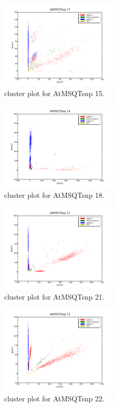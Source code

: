 \begin{figure}[H]
\includegraphics[width=0.5\textwidth]{figures/cluster_plot_AtMSQTsnp_15.png}
\caption{cluster plot for AtMSQTsnp 15.} \label{flAtMSQTsnp15}
\end{figure}

\begin{figure}[H]
\includegraphics[width=0.5\textwidth]{figures/cluster_plot_AtMSQTsnp_18.png}
\caption{cluster plot for AtMSQTsnp 18.} \label{flAtMSQTsnp18}
\end{figure}

\begin{figure}[H]
\includegraphics[width=0.5\textwidth]{figures/cluster_plot_AtMSQTsnp_21.png}
\caption{cluster plot for AtMSQTsnp 21.} \label{flAtMSQTsnp21}
\end{figure}

\begin{figure}[H]
\includegraphics[width=0.5\textwidth]{figures/cluster_plot_AtMSQTsnp_22.png}
\caption{cluster plot for AtMSQTsnp 22.} \label{flAtMSQTsnp22}
\end{figure}

